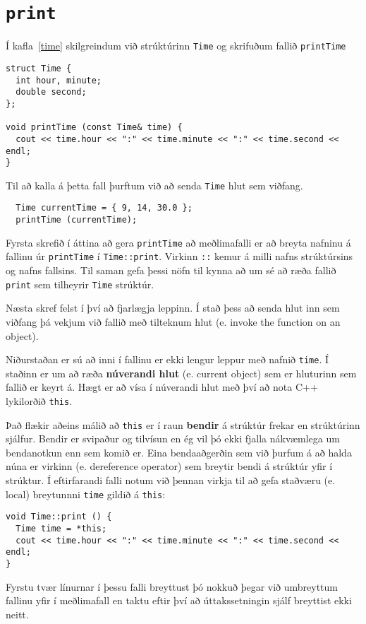 \section{{\tt print}}

Í kafla~\ref{time} skilgreindum við strúktúrinn {\tt Time}
og skrifuðum fallið {\tt printTime}

\begin{verbatim}
struct Time {
  int hour, minute;
  double second;
};

void printTime (const Time& time) {
  cout << time.hour << ":" << time.minute << ":" << time.second << endl;
}
\end{verbatim}
%
Til að kalla á þetta fall þurftum við að senda {\tt Time} hlut sem viðfang. 

\begin{verbatim}
  Time currentTime = { 9, 14, 30.0 };
  printTime (currentTime);
\end{verbatim}
%
Fyrsta skrefið í áttina að gera {\tt printTime} að meðlimafalli er að breyta nafninu á fallinu úr {\tt printTime} í {\tt Time::print}.
Virkinn {\tt ::} kemur á milli nafns strúktúrsins og nafns fallsins.
Til saman gefa þessi nöfn til kynna að um sé að ræða fallið {\tt print} sem tilheyrir {\tt Time} strúktúr.

Næsta skref felst í því að fjarlægja leppinn.
Í stað þess að senda hlut inn sem viðfang þá vekjum við fallið með tilteknum hlut (e. invoke the function on an object).

Niðurstaðan er sú að inni í fallinu er ekki lengur leppur með nafnið {\tt time}.
Í staðinn er um að ræða {\bf núverandi hlut} (e. current object) sem er hluturinn sem fallið er keyrt á.
Hægt er að vísa í núverandi hlut með því að nota C++ lykilorðið {\tt this}.


Það flækir aðeins málið að {\tt this} er í raun {\bf bendir} á strúktúr frekar en strúktúrinn sjálfur.
Bendir er svipaður og tilvísun en ég vil þó ekki fjalla nákvæmlega um bendanotkun enn sem komið er.
Eina bendaaðgerðin sem við þurfum á að halda núna er {\tt *} virkinn (e. dereference operator) sem breytir bendi á strúktúr yfir í strúktur.
Í eftirfarandi falli notum við þennan virkja til að gefa staðværu (e. local) breytunnni {\tt time} gildið á {\tt this}:

\begin{verbatim}
void Time::print () {
  Time time = *this;
  cout << time.hour << ":" << time.minute << ":" << time.second << endl;
}
\end{verbatim}
%
Fyrstu tvær línurnar í þessu falli breyttust þó nokkuð þegar við umbreyttum fallinu yfir í meðlimafall 
en taktu eftir því að úttakssetningin sjálf breyttist ekki neitt.

